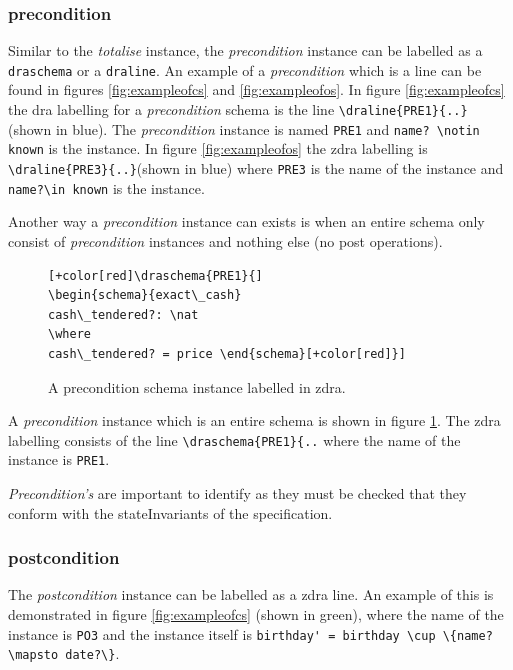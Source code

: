 \subsubsection{precondition}

Similar to the \emph{totalise} instance, the \emph{precondition} instance can be
labelled as a \verb|draschema| or a \verb|draline|. An example of a
\emph{precondition} which is a line can be found in figures
\ref{fig:exampleofcs} and \ref{fig:exampleofos}. In figure \ref{fig:exampleofcs}
the \gls{dra} labelling for a \emph{precondition} schema is the line
\verb|\draline{PRE1}{..}| (shown in blue). The \emph{precondition} instance is
named \verb|PRE1| and \verb|name? \notin known| is the instance. In figure
\ref{fig:exampleofos} the \gls{zdra} labelling is 
\verb|\draline{PRE3}{..}|(shown in blue) where \verb|PRE3| is the name of the
instance and 
\verb|name?\in known| is the instance.

Another way a \emph{precondition} instance can exists is when an entire schema
only consist of \emph{precondition} instances and nothing else (no post
operations).

\begin{figure}[H]
\centering
\begin{footnotesize}
\begin{BVerbatim}[commandchars=+\[\]]
[+color[red]\draschema{PRE1}{]
\begin{schema}{exact\_cash}
cash\_tendered?: \nat
\where
cash\_tendered? = price \end{schema}[+color[red]}]
\end{BVerbatim}
\end{footnotesize}
\caption{\label{fig:exampleofpre} A precondition schema instance labelled in \gls{zdra}.}
\end{figure}

A \emph{precondition} instance which is an entire schema is shown in figure
\ref{fig:exampleofpre}. The \gls{zdra} labelling consists of the line
\verb|\draschema{PRE1}{..| where the name of the instance is \verb|PRE1|.

\emph{Precondition's} are important to identify as they must be checked that they
conform with the stateInvariants of the specification.

\subsubsection{postcondition}

The \emph{postcondition} instance can be labelled as a \gls{zdra} line. An
example of this is demonstrated in figure \ref{fig:exampleofcs} (shown in
green), where the name of the instance is \verb|PO3| and the instance itself is
\verb|birthday' = birthday \cup \{name? \mapsto date?\}|.

